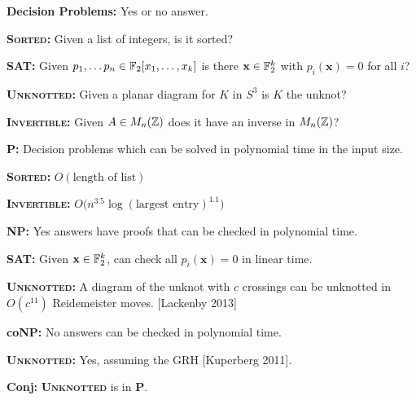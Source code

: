 \documentclass[aspect=4:3]{nmd-slide}
\newcommand{\alg}[1]{\textsc{\textbf{#1}}}
\newcommand{\x}{\mathbf{x}}
\begin{document}
\begin{frame}
  \textbf{Decision Problems:}  Yes or no answer.  
  
  \bigskip
  
  \alg{Sorted:} Given a list of integers, is it sorted?

  \medskip

  \alg{SAT:} Given $p_1, \ldots p_n \in {\mathbb F}_2[x_1, \ldots, x_k]$ is there $\x \in \F_2^k$ with $p_i(\x) = 0$ for all $i$? 

  \medskip

  \alg{Unknotted:}  Given a planar diagram for $K$ in $S^3$ is $K$ the unknot?

  \medskip

  \alg{Invertible:} Given $A \in M_n({\mathbb Z})$ does it have an inverse in $M_n({\mathbb Z})$?

  \vspace{1.5cm}

  \textbf{P:} Decision problems which can be solved in polynomial time in the input size.

  \smallskip 

  \quad \alg{Sorted:} $O(\mbox{length of list})$

  \smallskip 

  \quad \alg{Invertible:} $O\big(n^{3.5} \log(\mbox{largest entry})^{1.1}\big)$
\end{frame}

\begin{frame}
  \textbf{NP:}  Yes answers have proofs that can be checked in
  polynomial time.  
  
  \medskip 
  \alg{SAT:} Given $\x \in \F_2^k$, can check all $p_i(\x) = 0$ in linear time. 

  \medskip

  \alg{Unknotted:} A diagram of the unknot with $c$ crossings can be unknotted
   in $O(c^{11})$ Reidemeister moves.  [Lackenby 2013]

\vspace{1.5cm}

\textbf{coNP:}  No answers can be checked in polynomial time.

 \medskip
 \alg{Unknotted:}  Yes, assuming the GRH [Kuperberg 2011]. 

\vspace{1.5cm}

\textbf{Conj:}  \alg{Unknotted} is in \textbf{P}.  

\end{frame}
\end{document}

